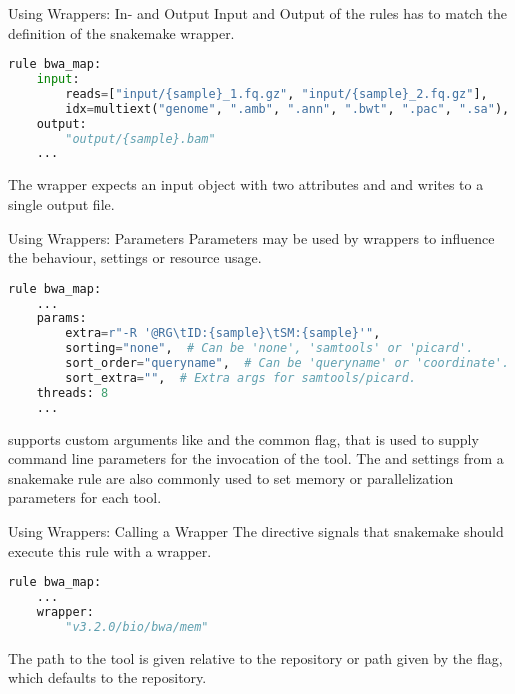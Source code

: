 \begin{frame}[fragile]{Using Wrappers: In- and Output}
    Input and Output of the rules has to match the definition of the snakemake wrapper.
    \begin{lstlisting}[language=Python,style=Python]
rule bwa_map:
    input:
        reads=["input/{sample}_1.fq.gz", "input/{sample}_2.fq.gz"],
        idx=multiext("genome", ".amb", ".ann", ".bwt", ".pac", ".sa"),
    output:
        "output/{sample}.bam"
    ...
    \end{lstlisting}
    \begin{docs}
        The  wrapper expects an input object with two attributes
         and  and writes to a single output file.
    \end{docs}
\end{frame}

\begin{frame}[fragile]{Using Wrappers: Parameters}
    Parameters may be used by wrappers to influence the behaviour, settings or resource usage.
    \begin{lstlisting}[language=Python,style=Python]
rule bwa_map:
    ...
    params:
        extra=r"-R '@RG\tID:{sample}\tSM:{sample}'",
        sorting="none",  # Can be 'none', 'samtools' or 'picard'.
        sort_order="queryname",  # Can be 'queryname' or 'coordinate'.
        sort_extra="",  # Extra args for samtools/picard.
    threads: 8
    ...
    \end{lstlisting}
    \begin{docs}
         supports custom arguments like  and
        the common  flag, that is used to supply command line parameters
        for the invocation of the tool. The  and 
        settings from a snakemake rule are also commonly used to set memory or parallelization
        parameters for each tool.
    \end{docs}
\end{frame}

\begin{frame}[fragile]{Using Wrappers: Calling a Wrapper}
    The  directive signals that snakemake should execute this rule with
    a wrapper.
    \begin{lstlisting}[language=Python,style=Python]
rule bwa_map:
    ...
    wrapper:
        "v3.2.0/bio/bwa/mem"
    \end{lstlisting}
    \begin{docs}
        The path to the tool is given relative to the repository or path given by the 
        flag, which defaults to the  repository.
    \end{docs}
\end{frame}

